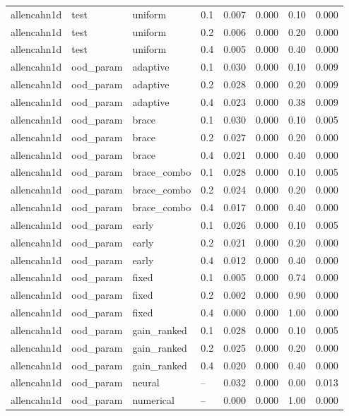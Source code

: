 \begin{tabular}{llllrrrr}
allencahn1d & test & uniform & 0.1 & 0.007 & 0.000 & 0.10 & 0.000 \\
allencahn1d & test & uniform & 0.2 & 0.006 & 0.000 & 0.20 & 0.000 \\
allencahn1d & test & uniform & 0.4 & 0.005 & 0.000 & 0.40 & 0.000 \\
\midrule
allencahn1d & ood\_param & adaptive & 0.1 & 0.030 & 0.000 & 0.10 & 0.009 \\
allencahn1d & ood\_param & adaptive & 0.2 & 0.028 & 0.000 & 0.20 & 0.009 \\
allencahn1d & ood\_param & adaptive & 0.4 & 0.023 & 0.000 & 0.38 & 0.009 \\
allencahn1d & ood\_param & brace & 0.1 & 0.030 & 0.000 & 0.10 & 0.005 \\
allencahn1d & ood\_param & brace & 0.2 & 0.027 & 0.000 & 0.20 & 0.000 \\
allencahn1d & ood\_param & brace & 0.4 & 0.021 & 0.000 & 0.40 & 0.000 \\
allencahn1d & ood\_param & brace\_combo & 0.1 & 0.028 & 0.000 & 0.10 & 0.005 \\
allencahn1d & ood\_param & brace\_combo & 0.2 & 0.024 & 0.000 & 0.20 & 0.000 \\
allencahn1d & ood\_param & brace\_combo & 0.4 & 0.017 & 0.000 & 0.40 & 0.000 \\
allencahn1d & ood\_param & early & 0.1 & 0.026 & 0.000 & 0.10 & 0.005 \\
allencahn1d & ood\_param & early & 0.2 & 0.021 & 0.000 & 0.20 & 0.000 \\
allencahn1d & ood\_param & early & 0.4 & 0.012 & 0.000 & 0.40 & 0.000 \\
allencahn1d & ood\_param & fixed & 0.1 & 0.005 & 0.000 & 0.74 & 0.000 \\
allencahn1d & ood\_param & fixed & 0.2 & 0.002 & 0.000 & 0.90 & 0.000 \\
allencahn1d & ood\_param & fixed & 0.4 & 0.000 & 0.000 & 1.00 & 0.000 \\
allencahn1d & ood\_param & gain\_ranked & 0.1 & 0.028 & 0.000 & 0.10 & 0.005 \\
allencahn1d & ood\_param & gain\_ranked & 0.2 & 0.025 & 0.000 & 0.20 & 0.000 \\
allencahn1d & ood\_param & gain\_ranked & 0.4 & 0.020 & 0.000 & 0.40 & 0.000 \\
allencahn1d & ood\_param & neural & -- & 0.032 & 0.000 & 0.00 & 0.013 \\
allencahn1d & ood\_param & numerical & -- & 0.000 & 0.000 & 1.00 & 0.000 \\

\end{tabular}
